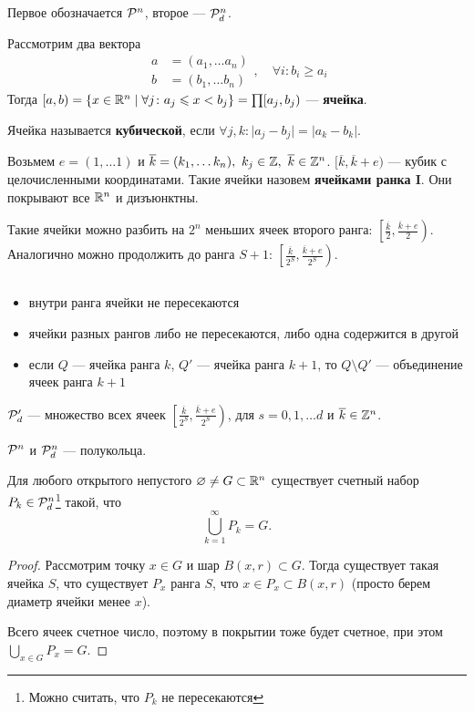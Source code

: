 \begin{ex}
	Первое обозначается $ \P^{n}$,  второе --- $ \P^{n}_{d}$.

	Рассмотрим два вектора
	\[
	\begin{aligned}
		a& = (a_1, \ldots a_{n}) \\
		b& = (b_1, \ldots b_n)
	\end{aligned}
	, \quad \forall i\colon b_i \ge a_i
	\]
	Тогда $ [a, b) = \{x \in \R^{n} \mid \forall j \colon a_j \le x < b_j\} = \prod [a_j, b_j)$ --- {\bf ячейка}.

	Ячейка называется {\bf кубической}, если $ \forall j, k \colon  \lvert a_j - b_j \rvert  = \lvert a_k - b_k \rvert $.

	Возьмем $ e = (1, \ldots 1)$ и $ \overline{k} = (k_1, \ldots k_n), ~ k_j \in \Z, ~ \overline{k} \in \Z^{n}$.
	$ [\overline{k}, \overline{k}+e)$ --- кубик с целочисленными координатами. Такие ячейки назовем {\bf ячейками ранка I}. Они покрывают все $ \R^{n} $ и дизъюнктны.  

	Такие ячейки можно разбить на $ 2^{n}$ меньших ячеек второго ранга: $ \left[ \frac{\overline{k}}{2}, \frac{\overline{k}+e}{2}\right)$. Аналогично можно продолжить до ранга $ S+1$:  $ \left[ \frac{\overline{k}}{2^{S}}, \frac{\overline{k}+e}{2^{S}} \right)$.
	\begin{prop}
		$ $
		\begin{itemize}
			\item внутри ранга ячейки не пересекаются
			\item ячейки разных рангов либо не пересекаются, либо одна содержится в другой
			\item если $ Q$ --- ячейка ранга $ k$, $ Q'$ --- ячейка ранга $ k+1$, то $ Q \setminus Q'$ --- объединение ячеек ранга $ k+1$
	    \end{itemize}
	\end{prop}
	$ \P_{d}' $ --- множество всех ячеек $ \left[ \frac{\overline{k}}{2^{S}}, \frac{\overline{k} +e}{2^{S}}\right)$, для $ s = 0, 1, \ldots d$ и $ \overline{k} \in \Z^{n}$.
\end{ex}
\begin{thm}
    $ \P^{n}$ и $ \P_{d}^{n}$ --- полукольца.
\end{thm}
\begin{thm}
	Для любого открытого непустого $ \varnothing \ne G \subset \R^{n} $ существует счетный набор $ P_k \in \P_{d}^{n}$\footnote{Можно считать, что $ P_k$ не пересекаются} такой, что
	\[
	\bigcup_{k=1}^{\infty} P_k = G
	.\] 
\end{thm}
\begin{proof}
	Рассмотрим точку $ x \in G$ и шар $ B(x, r) \subset G$.
	Тогда существует такая ячейка $ S$, что существует  $ P_x$ ранга $ S$, что  $ x \in P_x \subset B(x, r)$ (просто берем диаметр ячейки менее $ x$).

	Всего ячеек счетное число, поэтому в покрытии тоже будет счетное, при этом $ \bigcup_{x \in G} P_x = G$.
\end{proof}

